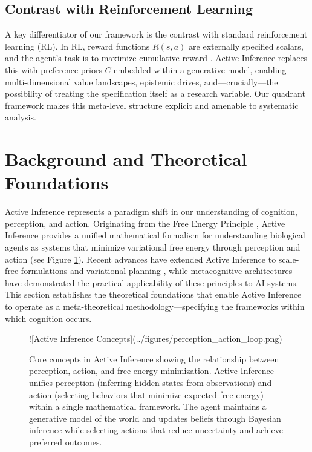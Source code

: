 \documentclass[
]{article}
\begin{document}
\subsection{Contrast with Reinforcement
Learning}\label{contrast-with-reinforcement-learning}

A key differentiator of our framework is the contrast with standard
reinforcement learning (RL). In RL, reward functions \(R(s,a)\) are
externally specified scalars, and the agent's task is to maximize
cumulative reward \cite{tschantz2020scaling}. Active Inference replaces
this with preference priors \(C\) embedded within a generative model,
enabling multi-dimensional value landscapes, epistemic drives,
and---crucially---the possibility of treating the specification itself
as a research variable. Our quadrant framework makes this meta-level
structure explicit and amenable to systematic analysis.

\newpage

\section{Background and Theoretical Foundations}\label{sec:background}

Active Inference represents a paradigm shift in our understanding of
cognition, perception, and action. Originating from the Free Energy
Principle \cite{friston2010free}, Active Inference provides a unified
mathematical formalism for understanding biological agents as systems
that minimize variational free energy through perception and action (see
Figure \ref{fig:active_inference_concepts}). Recent advances have
extended Active Inference to scale-free formulations
\cite{friston2025scalefree} and variational planning
\cite{champion2025efeplanning}, while metacognitive architectures
\cite{metamind2025, sofai2025} have demonstrated the practical
applicability of these principles to AI systems. This section
establishes the theoretical foundations that enable Active Inference to
operate as a meta-theoretical methodology---specifying the frameworks
within which cognition occurs.

\begin{figure}[h]
\centering
![Active Inference Concepts](../figures/perception_action_loop.png)
\caption{Core concepts in Active Inference showing the relationship between perception, action, and free energy minimization. Active Inference unifies perception (inferring hidden states from observations) and action (selecting behaviors that minimize expected free energy) within a single mathematical framework. The agent maintains a generative model of the world and updates beliefs through Bayesian inference while selecting actions that reduce uncertainty and achieve preferred outcomes.}
\label{fig:active_inference_concepts}
\end{figure}
\end{document}
